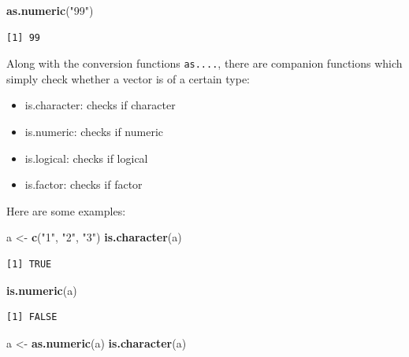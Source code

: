 \documentclass[
]{book}
\newenvironment{Shaded}{\begin{snugshade}}{\end{snugshade}}
\newcommand{\KeywordTok}[1]{\textcolor[rgb]{0.13,0.29,0.53}{\textbf{#1}}}
\newcommand{\NormalTok}[1]{#1}
\newcommand{\StringTok}[1]{\textcolor[rgb]{0.31,0.60,0.02}{#1}}
\providecommand{\tightlist}{%
  \setlength{\itemsep}{0pt}\setlength{\parskip}{0pt}}
\begin{document}
\begin{Shaded}
\begin{Highlighting}[]
\KeywordTok{as.numeric}\NormalTok{(}\StringTok{"99"}\NormalTok{)}
\end{Highlighting}
\end{Shaded}

\begin{verbatim}
[1] 99
\end{verbatim}

Along with the conversion functions \texttt{as....}, there are companion functions which simply check whether a vector is of a certain type:

\begin{itemize}
\tightlist
\item
  is.character: checks if character
\item
  is.numeric: checks if numeric
\item
  is.logical: checks if logical
\item
  is.factor: checks if factor
\end{itemize}

Here are some examples:

\begin{Shaded}
\begin{Highlighting}[]
\NormalTok{a <-}\StringTok{ }\KeywordTok{c}\NormalTok{(}\StringTok{"1"}\NormalTok{, }\StringTok{"2"}\NormalTok{, }\StringTok{"3"}\NormalTok{)}
\KeywordTok{is.character}\NormalTok{(a)}
\end{Highlighting}
\end{Shaded}

\begin{verbatim}
[1] TRUE
\end{verbatim}

\begin{Shaded}
\begin{Highlighting}[]
\KeywordTok{is.numeric}\NormalTok{(a)}
\end{Highlighting}
\end{Shaded}

\begin{verbatim}
[1] FALSE
\end{verbatim}

\begin{Shaded}
\begin{Highlighting}[]
\NormalTok{a <-}\StringTok{ }\KeywordTok{as.numeric}\NormalTok{(a)}
\KeywordTok{is.character}\NormalTok{(a)}
\end{Highlighting}
\end{Shaded}
\end{document}
